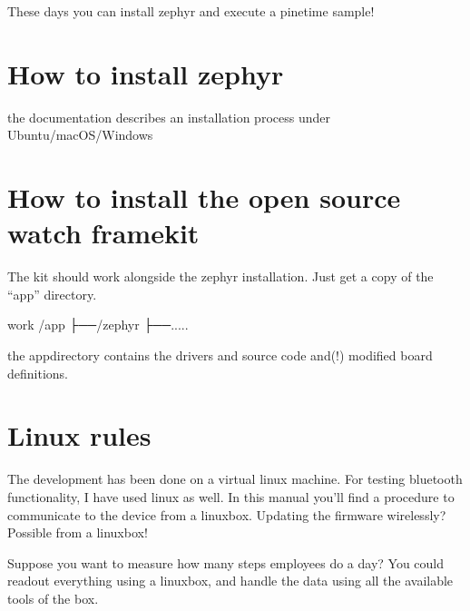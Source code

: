 \documentclass[letterpaper,10pt,english]{sphinxmanual}
\begin{document}
These days you can install zephyr and execute a pinetime sample!

\begin{sphinxVerbatim}[commandchars=\\\{\}]
     
\end{sphinxVerbatim}


\section{How to install zephyr}
\label{\detokenize{installation:how-to-install-zephyr}}

the documentation describes an installation process under Ubuntu/macOS/Windows


\section{How to install the open source watch framekit}
\label{\detokenize{installation:how-to-install-the-open-source-watch-framekit}}
The kit should work alongside the zephyr installation.
Just get a copy of the “app” directory.

\begin{sphinxVerbatim}[commandchars=\\\{\}]
\PYGZlt{}work\PYGZgt{}  /app
     ├──/zephyr
     ├──.....
\end{sphinxVerbatim}

the app\sphinxhyphen{}directory contains the drivers and source code and(!) modified board definitions.


\section{Linux rules}
\label{\detokenize{installation:linux-rules}}
The development has been done on a virtual linux machine.
For testing bluetooth functionality, I have used linux as well.
In this manual you’ll find a procedure to communicate to the device from a linuxbox.
Updating the firmware wirelessly? Possible from a linuxbox!

Suppose you want to measure how many steps employees do a day?
You could readout everything using a linuxbox, and handle the data using all the available tools of the box.
\end{document}
